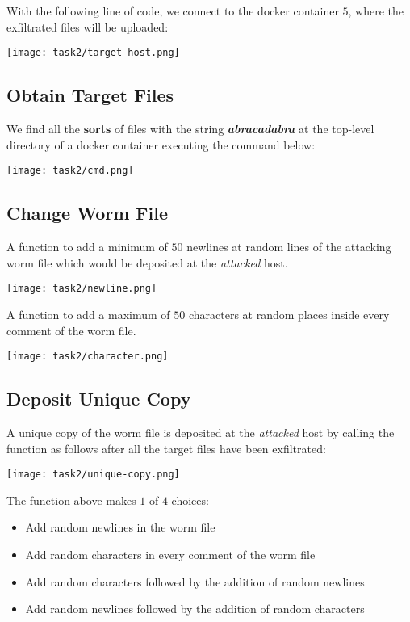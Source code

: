 \documentclass{article}
\begin{document}
With the following line of code, we connect to the docker container $5$, where the exfiltrated files will be uploaded:
\begin{center}
    \texttt{[image: task2/target-host.png]}
\end{center}


 \subsection{Obtain Target Files}
We find all the \textbf{sorts} of files with the string \textbf{\textit{abracadabra}} at the top-level directory of a docker container executing the command below:
\begin{center}
    \texttt{[image: task2/cmd.png]}
\end{center}

 \subsection{Change Worm File}
 A function to add a minimum of $50$ newlines at random lines of the attacking worm file which would be deposited at the \textit{attacked} host.
 \begin{center}
    \texttt{[image: task2/newline.png]}
\end{center}

A function to add a maximum of $50$ characters at random places inside every comment of the worm file.
\begin{center}
    \texttt{[image: task2/character.png]}
\end{center}

\subsection{Deposit Unique Copy}
A unique copy of the worm file is deposited at the \textit{attacked} host by calling the function as follows after all the target files have been exfiltrated:
\begin{center}
    \texttt{[image: task2/unique-copy.png]}
\end{center}

The function above makes $1$ of $4$ choices:
\begin{itemize}
    \item Add random newlines in the worm file
    \item Add random characters in every comment of the worm file
    \item Add random characters followed by the addition of random newlines
    \item Add random newlines followed by the addition of random characters
\end{itemize}
\end{document}
